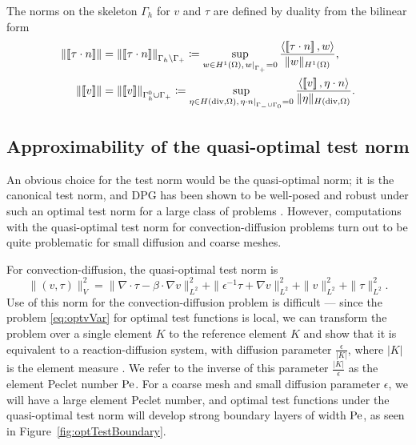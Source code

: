 \documentclass[11pt,onecolumn]{scrartcl}
\newcommand{\eqnref}[1]{\eqref{eq:#1}}
\newcommand{\LRs}[1]{\left[ #1 \right]}
\newcommand{\jump}[1] {\ensuremath{\LRs{\![#1]\!}}}
\newcommand{\Gh}{\Gamma_h}
\newcommand{\grad}{\nabla}
\renewcommand{\div}{\grad \cdot}
\begin{document}
The norms on the skeleton $\Gh$ for $v$ and $\tau$ are defined by duality from the bilinear form
\begin{align*}
\left\|\jump{\tau\cdot n}\right\| &= \left\|\jump{\tau\cdot n}\right\|_{\Gh \setminus \Gamma_+} \coloneqq \sup_{w\in H^1(\Omega), \left.w\right|_{\Gamma_+} = 0} \frac{\langle \jump{\tau \cdot n}, w\rangle}{\|w\|_{H^1(\Omega)}},\\
\left\|\jump{v}\right\|&=\left\|\jump{v}\right\|_{\Gh^0 \cup \Gamma_+} \coloneqq \sup_{\eta\in H({\rm div},\Omega), \left.\eta\cdot n\right|_{\Gamma_- \cup \Gamma_0} = 0} \frac{\langle \jump{v}, \eta\cdot n\rangle}{\|\eta\|_{H({\rm div},\Omega)}}.
\end{align*}

\subsection{Approximability of the quasi-optimal test norm}
An obvious choice for the test norm would be the quasi-optimal norm; it is the canonical test norm, and DPG has been shown to be well-posed and robust under such an optimal test norm for a large class of problems \cite{DPGrobustness,Bui-ThanhDemkowiczGhattas11b, stokesDPG}. However, computations with the quasi-optimal test norm for convection-diffusion problems turn out to be quite problematic for small diffusion and coarse meshes.  

For convection-diffusion, the quasi-optimal test norm is 
\[
\|\left(v,\tau\right)\|_V^2 = \| \div \tau - \beta \cdot \grad v
\|_{L^2}^2 + \| \epsilon^{-1} \tau + \grad v \|_{L^2}^2 +
\|v\|_{L^2}^2 + \|\tau\|_{L^2}^2.
\]
Use of this norm for the convection-diffusion problem is difficult --- since the problem \eqnref{optvVar} for optimal test functions is local, we can transform the problem over a single element $K$ to the reference element $\widehat{K}$ and show that it is equivalent to a reaction-diffusion system, with diffusion parameter $\frac{\epsilon}{|K|}$, where $|K|$ is the element measure \cite{DBLP:journals/procedia/NiemiCC11}. We refer to the inverse of this parameter $\frac{|K|}{\epsilon}$ as the element Peclet number $\rm Pe$. For a coarse mesh and small diffusion parameter $\epsilon$, we will have a large element Peclet number, and optimal test functions under the quasi-optimal test norm will develop strong boundary layers of width $\rm Pe$, as seen in Figure~\ref{fig:optTestBoundary}.
\end{document}
